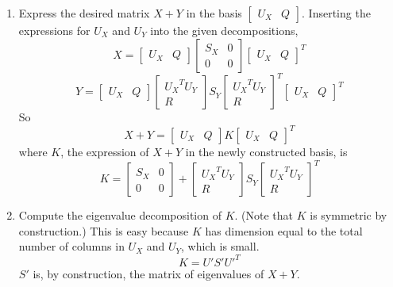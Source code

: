 \documentclass[english]{article}
\begin{document}
\begin{enumerate}
\item Express the desired matrix $X + Y$ in the basis $\left[\begin{array}{cc} U_X & Q\end{array}\right]$.  Inserting the expressions for $U_X$ and $U_Y$ into the given decompositions,
\[X = \left[\begin{array}{cc} U_X & Q\end{array}\right] \left[\begin{array}{cc} S_X & 0 \\ 0 & 0\end{array}\right] \left[\begin{array}{cc} U_X & Q\end{array}\right]^T\]
\[Y = \left[\begin{array}{cc} U_X & Q\end{array}\right] \left[\begin{array}{c} {U_X}^T U_Y \\ R\end{array}\right] S_Y  \left[\begin{array}{c} {U_X}^T U_Y \\ R\end{array}\right]^T \left[\begin{array}{cc} U_X & Q\end{array}\right]^T\]
So
\[X + Y = \left[\begin{array}{cc} U_X & Q\end{array}\right] K \left[\begin{array}{cc} U_X & Q\end{array}\right]^T\]
where $K$, the expression of $X + Y$ in the newly constructed basis, is
\begin{equation}\label{K} K = \left[\begin{array}{cc} S_X & 0 \\ 0 & 0\end{array}\right] + \left[\begin{array}{c} {U_X}^T U_Y \\ R\end{array}\right] S_Y  \left[\begin{array}{c} {U_X}^T U_Y \\ R\end{array}\right]^T \end{equation}

\item Compute the eigenvalue decomposition of $K$.  (Note that $K$ is symmetric by construction.)  This is easy because $K$ has dimension equal to the total number of columns in $U_X$ and $U_Y$, which is small.
\begin{equation} \label{decomp} K = U' S' U'^T \end{equation}
$S'$ is, by construction, the matrix of eigenvalues of $X + Y$.


\end{enumerate}
\end{document}
